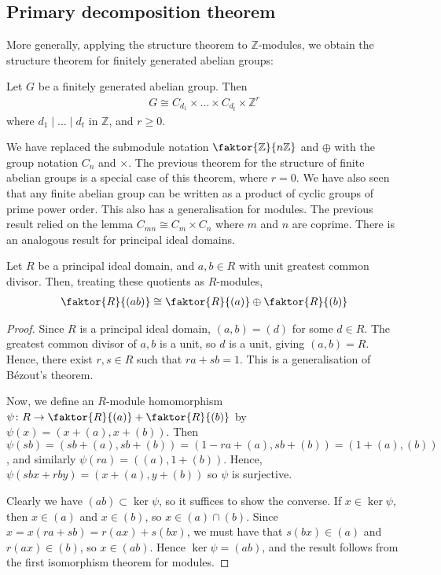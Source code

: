 \subsection{Primary decomposition theorem}
More generally, applying the structure theorem to $\mathbb Z$-modules, we obtain the structure theorem for finitely generated abelian groups:
\begin{theorem}
	Let $G$ be a finitely generated abelian group.
	Then
	\begin{align*}
		G \cong C_{d_1} \times \dots \times C_{d_t} \times \mathbb Z^r
	\end{align*}
	where $d_1 \mid \dots \mid d_t$ in $\mathbb Z$, and $r \geq 0$.
\end{theorem}
We have replaced the submodule notation $\faktor{\mathbb Z}{n\mathbb Z}$ and $\oplus$ with the group notation $C_n$ and $\times$.
The previous theorem for the structure of finite abelian groups is a special case of this theorem, where $r = 0$.
We have also seen that any finite abelian group can be written as a product of cyclic groups of prime power order.
This also has a generalisation for modules.
The previous result relied on the lemma $C_{mn} \cong C_m \times C_n$ where $m$ and $n$ are coprime.
There is an analogous result for principal ideal domains.
\begin{lemma}
	Let $R$ be a principal ideal domain, and $a, b \in R$ with unit greatest common divisor.
	Then, treating these quotients as $R$-modules,
	\begin{align*}
		\faktor{R}{(ab)} \cong \faktor{R}{(a)} \oplus \faktor{R}{(b)}
	\end{align*}
\end{lemma}
\begin{proof}
	Since $R$ is a principal ideal domain, $(a,b) = (d)$ for some $d \in R$.
	The greatest common divisor of $a, b$ is a unit, so $d$ is a unit, giving $(a,b) = R$.
	Hence, there exist $r,s \in R$ such that $ra + sb = 1$.
	This is a generalisation of B\'ezout's theorem.

	Now, we define an $R$-module homomorphism $\psi \colon R \to \faktor{R}{(a)} + \faktor{R}{(b)}$ by $\psi(x) = (x+(a), x+(b))$.
	Then $\psi(sb) = (sb+(a), sb+(b)) = (1-ra+(a),sb+(b)) = (1+(a), (b))$, and similarly $\psi(ra) = ((a),1+(b))$.
	Hence, $\psi(sbx + rby) = (x+(a),y+(b))$ so $\psi$ is surjective.

	Clearly we have $(ab) \subset \ker \psi$, so it suffices to show the converse.
	If $x \in \ker \psi$, then $x \in (a)$ and $x \in (b)$, so $x \in (a) \cap (b)$.
	Since $x = x(ra+sb) = r(ax) + s(bx)$, we must have that $s(bx) \in (a)$ and $r(ax) \in (b)$, so $x \in (ab)$.
	Hence $\ker \psi = (ab)$, and the result follows from the first isomorphism theorem for modules.
\end{proof}
